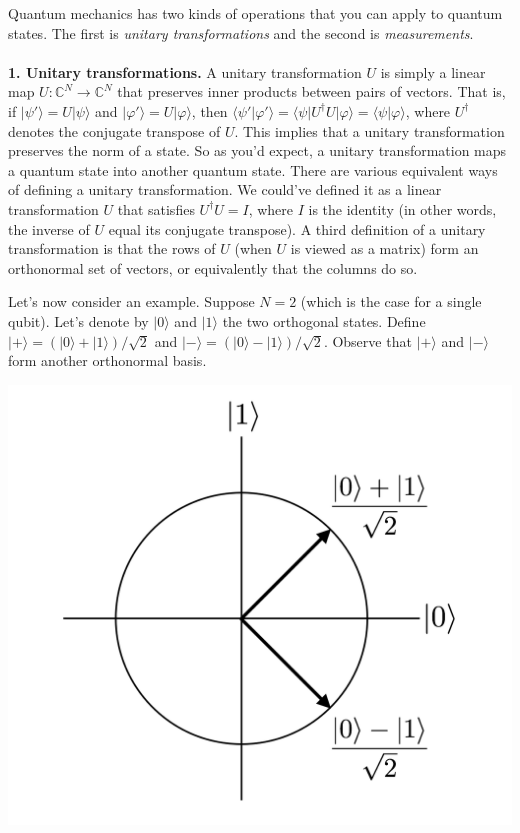\documentclass[12pt]{report}
\theoremstyle{plain}
\theoremstyle{definition}
\newcommand{\C}{{\mathbb C}}
\renewcommand{\bra}[1]{\langle#1|}
\renewcommand{\ket}[1]{|#1\rangle}
\newcommand{\braket}[2]{\langle#1|#2\rangle}
\begin{document}
Quantum mechanics has two kinds of operations that you can apply to quantum states. The first is \emph{unitary transformations} and the second is \emph{measurements}.
\\\\
\noindent
{\bf 1. Unitary transformations.} A unitary transformation $U$ is simply a linear map $U: \C^N \to \C^N$ that preserves inner products between pairs of vectors. That is, if $\ket{\psi'} = U \ket{\psi}$ and $\ket{\varphi'} = U\ket{\varphi}$, then $\braket{\psi'}{\varphi'} = \bra{\psi} U^\dagger U \ket{\varphi} = \braket{\psi}{\varphi}$, where $U^\dagger$ denotes the conjugate transpose of $U$. This implies that a unitary transformation preserves the norm of a state. So as you'd expect, a unitary transformation maps a quantum state into another quantum state. There are various equivalent ways of defining a unitary transformation. We could've defined it as a linear transformation $U$ that satisfies $U^\dagger U = I$, where $I$ is the identity (in other words, the inverse of $U$ equal its conjugate transpose). A third definition of a unitary transformation is that the rows of $U$ (when $U$ is viewed as a matrix) form an orthonormal set of vectors, or equivalently that the columns do so.

Let's now consider an example. Suppose $N = 2$ (which is the case for a single qubit). Let's denote by $\ket{0}$ and $\ket{1}$ the two orthogonal states. Define $\ket{+} = (\ket{0} + \ket{1})/\sqrt{2}$ and $\ket{-} = (\ket{0} - \ket{1})/\sqrt{2}$. Observe that $\ket{+}$ and $\ket{-}$ form another orthonormal basis.

\begin{center}
	\includegraphics[scale=0.35]{fig1}
\end{center}
\end{document}
